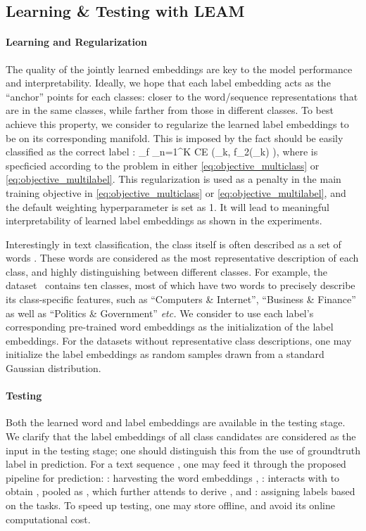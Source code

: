 \documentclass[11pt,a4paper]{article}
\newcommand{\etc}[0]{\emph{etc. }}
\newcommand{\beq}{\vspace{0mm}}
\newcommand{\cv}[0]{{\boldsymbol{c}}}
\newcommand{\yv}{\boldsymbol{y}}
\newcommand{\Fcal}{\mathcal{F}}
\begin{document}
\subsection{Learning \& Testing with LEAM}

\paragraph{Learning and Regularization}
The quality of the jointly learned embeddings are key to the model performance and interpretability. Ideally, we hope that each label embedding acts as the ``anchor'' points for each classes: closer to the word/sequence representations that are in the same classes, while farther from those in different classes. 
To best achieve this property, we consider to regularize the learned label embeddings  to be on its corresponding manifold. This is imposed by the fact  should be easily classified as the correct label :
\beq
\min_{f \in \Fcal}  \sum_{n=1}^{K}
\mbox{CE} (\yv_{k}, f_2(\cv_{k}) ),
\label{eq:objective_label}
\eeq
where  is specficied according to the problem in either \eqref{eq:objective_multiclass} or \eqref{eq:objective_multilabel}.
This regularization is used as a penalty in the main training objective in \eqref{eq:objective_multiclass} or \eqref{eq:objective_multilabel}, and the default weighting hyperparameter is set as 1. It will lead to meaningful interpretability of learned label embeddings as shown in the experiments.





Interestingly in text classification, the class itself is often described as a set of  words . 
These words are considered as the most representative description of each class, and highly distinguishing between different classes.
For example, the  dataset~\cite{zhang2015character} contains ten classes, most of which have two words to precisely describe its class-specific features, such as ``Computers \& Internet'', ``Business \& Finance'' as well as ``Politics \& Government'' \etc 
We consider to use each label's corresponding pre-trained word embeddings as the initialization of the label embeddings.  
For the datasets without representative class descriptions, one may initialize the label embeddings as random samples drawn from a standard Gaussian distribution.

\paragraph{Testing}
Both the learned word and label embeddings are available in the testing stage.
We clarify that the label embeddings  of all class candidates  are considered as the input in the testing stage; one should distinguish this from the use of groundtruth label  in prediction.
For a text sequence , one may feed it through the proposed pipeline for prediction: 
 : harvesting the word embeddings , 
 :  interacts with  to obtain , pooled as , which further attends  to derive , and
 : assigning labels based on the tasks. To speed up testing, one may store  offline, and avoid its online computational cost.
\end{document}
